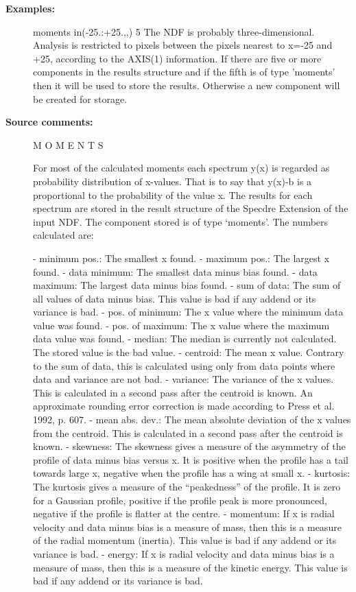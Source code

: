 \begin{description}
\begin{description}
\item [\textbf{Examples:}]
\begin{terminalv}
moments in(-25.:+25.,,) 5
   The NDF is probably three-dimensional. Analysis is restricted
   to pixels between the pixels nearest to x=-25 and +25,
   according to the AXIS(1) information. If there are five or more
   components in the results structure and if the fifth is of type
   'moments' then it will be used to store the results. Otherwise
   a new component will be created for storage.

\end{terminalv}

\item [\textbf{Source comments:}]
\begin{terminalv}
   M O M E N T S

   For most of the calculated moments each spectrum y(x) is regarded
   as probability distribution of x-values. That is to say that y(x)-b
   is a proportional to the probability of the value x. The results for
   each spectrum are stored in the result structure of the Specdre
   Extension of the input NDF. The component stored is of type `moments'.
   The numbers calculated are:

   -  minimum pos.: The smallest x found.
   -  maximum pos.: The largest x found.
   -  data minimum: The smallest data minus bias found.
   -  data maximum: The largest data minus bias found.
   -  sum of data: The sum of all values of data minus bias. This
      value is bad if any addend or its variance is bad.
   -  pos. of minimum: The x value where the minimum data value was
      found.
   -  pos. of maximum: The x value where the maximum data value was
      found.
   -  median: The median is currently not calculated. The stored
      value is the bad value.
   -  centroid: The mean x value. Contrary to the sum of data, this
      is calculated using only from data points where data and
      variance are not bad.
   -  variance: The variance of the x values. This is calculated in a
      second pass after the centroid is known. An approximate
      rounding error correction is made according to Press et
      al. 1992, p. 607.
   -  mean abs. dev.: The mean absolute deviation of the x values
      from the centroid. This is calculated in a second pass after
      the centroid is known.
   -  skewness: The skewness gives a measure of the asymmetry of the
      profile of data minus bias versus x. It is positive when the
      profile has a tail towards large x, negative when the profile
      has a wing at small x.
   -  kurtosis: The kurtosis gives a measure of the ``peakedness'' of
      the profile. It is zero for a Gaussian profile, positive if the
      profile peak is more pronounced, negative if the profile is
      flatter at the centre.
   -  momentum: If x is radial velocity and data minus bias is a
      measure of mass, then this is a measure of the radial momentum
      (inertia). This value is bad if any addend or its variance is
      bad.
   -  energy: If x is radial velocity and data minus bias is a
      measure of mass, then this is a measure of the kinetic
      energy. This value is bad if any addend or its variance is bad.


\end{terminalv}
\end{description}
\end{description}
